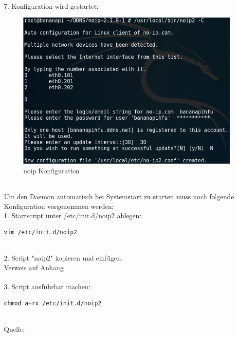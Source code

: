 ~\\
7. Konfiguration wird gestartet:
\begin{figure}[ht]
\includegraphics[width=\textwidth]{pictures/Jonas/noip_Konfiguration}
\caption{noip Konfiguration}
\end{figure}

~\\
Um den Daemon automatisch bei Systemstart zu starten muss noch folgende Konfiguration vorgenommen werden:\\
1. Startscript unter /etc/init.d/noip2 ablegen:
\begin{lstlisting}
vim /etc/init.d/noip2
\end{lstlisting}
~\\
2. Script "noip2" kopieren und einfügen:\\
Verweis auf Anhang\\
~\\
3. Script ausführbar machen:
\begin{lstlisting}
chmod a+rx /etc/init.d/noip2
\end{lstlisting}
~\\ Quelle: \cite{noip}
\newpage
